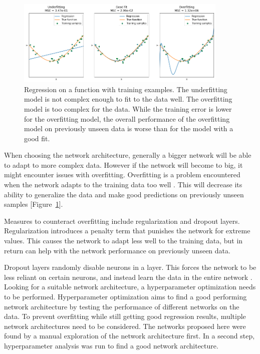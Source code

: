 \begin{figure} [H]
    \centering
    \includegraphics[width=0.9\textwidth]{figures/regression/overfitting.png} 
    \caption[Overfitting]{Regression on a function with training examples. 
            The underfitting model is not complex enough to fit to the data well. 
            The overfitting model is too complex for the data.
            While the training error is lower for the overfitting model, 
            the overall performance of the overfitting model on previously unseen data 
            is worse than for the model with a good fit.
        }
    \label{fig:overfitting}
\end{figure}
  
When choosing the network architecture, generally a bigger network will be able to adapt to more complex data.
However if the network will become to big, it might encounter issues with overfitting.
Overfitting is a problem encountered when the network adapts to the training data too well \cite{bishop2006pattern}.
This will decrease its ability to generalize the data and make good predictions on previously unseen samples [Figure~\ref{fig:overfitting}].


Measures to counteract overfitting include regularization and dropout layers.
Regularization introduces a penalty term that punishes the network for extreme values.
This causes the network to adapt less well to the training data, but in return can help with the network
performance on previously unseen data.

Dropout layers randomly disable neurons in a layer.
This forces the network to be less reliant on certain neurons, and instead learn the data in the entire network \cite{baldi2013understanding}.
\\

Looking for a suitable network architecture, a hyperparameter optimization needs to be performed.
Hyperparameter optimization aims to find a good performing network architecture by testing the performance
of different networks on the data.
To prevent overfitting while still getting good regression results, multiple network architectures need to be considered.
The networks proposed here were found by a manual exploration of the network architecture first.
In a second step, hyperparameter analysis was run to find a good network architecture.

